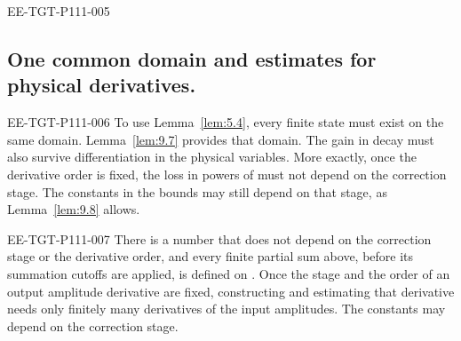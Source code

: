 \begin{EESegment}{EE-TGT-P111-005}
\subsection{One common domain and estimates for physical derivatives.}\label{sec:9.4}
\end{EESegment}
\begin{EESegment}{EE-TGT-P111-006}
To use Lemma~\ref{lem:5.4}, every finite state
 must exist on the same domain. Lemma~\ref{lem:9.7}
provides that domain. The gain in decay must also survive differentiation in the physical
variables. More exactly, once the derivative order is fixed, the loss in powers of
 must not depend on the correction stage. The constants in the bounds may
still depend on that stage, as Lemma~\ref{lem:9.8} allows.
\end{EESegment}

\begin{lemma}\label{lem:9.7}
\begin{EESegment}{EE-TGT-P111-007}
There is a number  that does not depend on the correction
stage or the derivative order, and every finite partial sum above, before its summation cutoffs are
applied, is defined on . Once the stage and the order of
an output amplitude derivative are fixed, constructing and estimating that derivative needs only
finitely many derivatives of the input amplitudes. The constants may depend on the correction
stage.
\end{EESegment}
\end{lemma}

